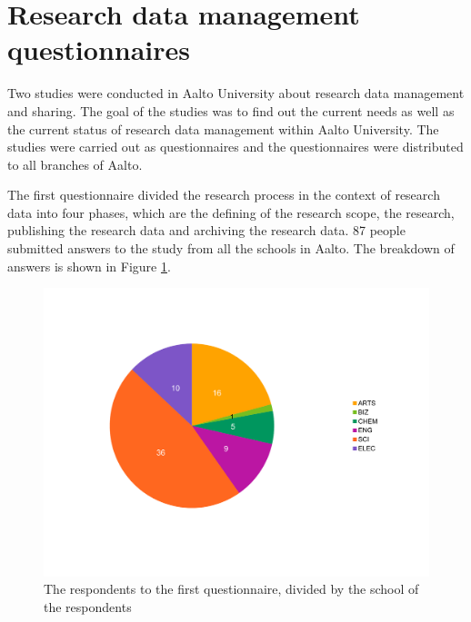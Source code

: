\fi

\section{Research data management questionnaires}
\label{sec:questionnaire}

Two studies were conducted in Aalto University about research data management
and sharing. The goal of the studies was to find out the current needs as well
as the current status of research data management within Aalto University. The
studies were carried out as questionnaires and the questionnaires were
distributed to all branches of Aalto.

The first questionnaire divided
the research process in the context of research data into four phases, which
are the defining of the research scope, the research, publishing the research
data and archiving the research data. 87 people submitted answers to the study from all the
schools in Aalto. The breakdown of answers is shown in Figure \ref{fig:chart_answers}.

\begin{figure}
    \begin{centering}
        \includegraphics[width=\textwidth]{images/chart_answers}
    \end{centering}
    \caption{The respondents to the first questionnaire, divided by the school of the respondents}
    \label{fig:chart_answers}
\end{figure}

